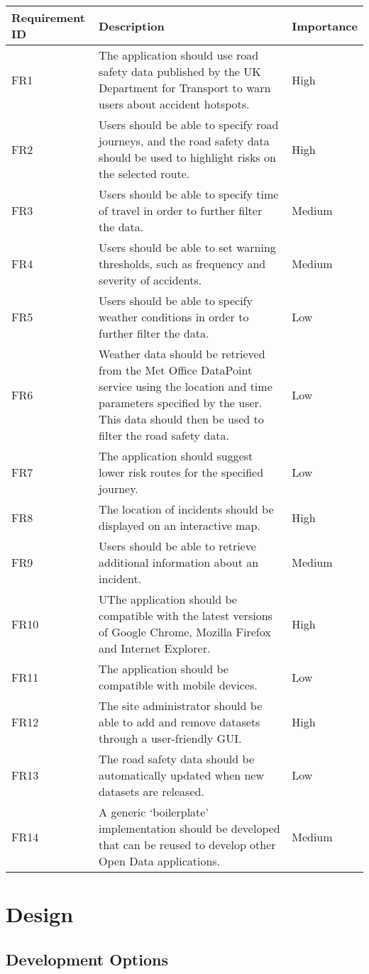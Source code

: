 \documentclass[authoryearcitations]{UoYCSproject}
\begin{document}
\begin{tabular}{| p{2.2cm} | p{7.5cm} | p{2cm} |}
	\hline
	\textbf{Requirement ID} & \textbf{Description} & \textbf{Importance} \\ \hline
	FR1 & The application should use road safety data published by the UK Department for Transport to warn users about accident hotspots. & High \\ \hline
	FR2 & Users should be able to specify road journeys, and the road safety data should be used to highlight risks on the selected route. & High \\ \hline
	FR3 & Users should be able to specify time of travel in order to further filter the data. & Medium \\ \hline
	FR4 & Users should be able to set warning thresholds, such as frequency and severity of accidents. & Medium \\ \hline
	FR5 & Users should be able to specify weather conditions in order to further filter the data. & Low \\ \hline
	FR6 & Weather data should be retrieved from the Met Office DataPoint service using the location and time parameters specified by the user. This data should then be used to filter the road safety data. & Low \\ \hline
	FR7 & The application should suggest lower risk routes for the specified journey. & Low \\ \hline
	FR8 & The location of incidents should be displayed on an interactive map. & High \\ \hline
	FR9 & Users should be able to retrieve additional information about an incident. & Medium \\ \hline
	FR10 & UThe application should be compatible with the latest versions of Google Chrome, Mozilla Firefox and Internet Explorer. & High \\ \hline
	FR11 & The application should be compatible with mobile devices. & Low \\ \hline
	FR12 & The site administrator should be able to add and remove datasets through a user-friendly GUI. & High \\ \hline
	FR13 & The road safety data should be automatically updated when new datasets are released. & Low \\ \hline
	FR14 & A generic ‘boilerplate’ implementation should be developed that can be reused to develop other Open Data applications. & Medium \\
	\hline
\end{tabular}

\chapter{Design}

\section{Development Options}





\end{document}
